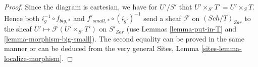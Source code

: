 \documentclass[10pt,a4paper]{amsart}
\theoremstyle{plain}
\theoremstyle{definition}
\theoremstyle{remark}
\numberwithin{equation}{subsection}
\def\Sch{\mathit{Sch}}
\begin{document}
\begin{proof}
Since the diagram is cartesian, we have for $U'/S'$
that $U' \times_{S'} T' = U' \times_S T$. Hence both
$i_g^{-1} \circ f_{big, *}$ and $f'_{small, *} \circ (i_{g'})^{-1}$
send a sheaf $\mathcal{F}$ on $(\Sch/T)_{Zar}$ to the sheaf
$U' \mapsto \mathcal{F}(U' \times_{S'} T')$ on $S'_{Zar}$
(use Lemmas \ref{lemma-put-in-T} and \ref{lemma-morphism-big-small}).
The second equality can be proved in the same manner or can be
deduced from the very general
Sites, Lemma \ref{sites-lemma-localize-morphism}.
\end{proof}
\end{document}
